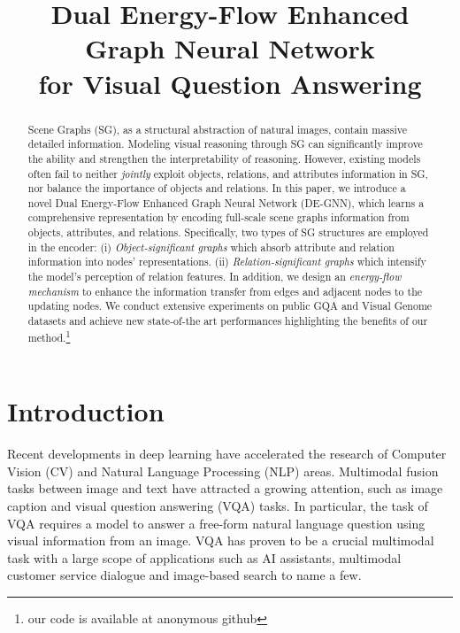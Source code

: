 \documentclass[letterpaper]{article} %
\title{Dual Energy-Flow Enhanced Graph Neural Network\\ for Visual Question Answering}
\begin{document}
\maketitle

\begin{abstract}
Scene Graphs (SG), as a structural abstraction of natural images, contain massive detailed information. 
Modeling visual reasoning through SG can significantly improve the ability and strengthen the interpretability of reasoning. 
However, existing models often fail to neither \emph{jointly} exploit objects, relations, and attributes information in SG, nor balance the importance of objects and relations. 
In this paper, we introduce a novel Dual Energy-Flow Enhanced Graph Neural Network (DE-GNN), which learns a comprehensive representation by encoding full-scale scene graphs information from objects, attributes, and relations.
Specifically, two types of SG structures are employed in the encoder: 
(i) \textit{Object-significant graphs} which absorb attribute and relation information into nodes' representations. 
(ii) \textit{Relation-significant graphs} which intensify the model's perception of relation features. 
In addition, we design an \textit{energy-flow mechanism} to enhance the information transfer from edges and adjacent nodes to the updating nodes. 
We conduct extensive experiments on public GQA and Visual Genome datasets and achieve new state-of-the art performances highlighting the benefits of our method.\footnote{our code is available at anonymous github}
\end{abstract}

\section{Introduction}
Recent developments in deep learning have accelerated the research of Computer Vision (CV) and Natural Language Processing (NLP) areas. Multimodal fusion tasks between image and text have attracted a growing attention, such as image caption and visual question answering (VQA) tasks. 
In particular, the task of VQA requires a model to answer a free-form natural language question using visual information from an image. 
VQA has proven to be a crucial multimodal task with a large scope of applications such as AI assistants, multimodal customer service dialogue and image-based search to name a few.
\end{document}
